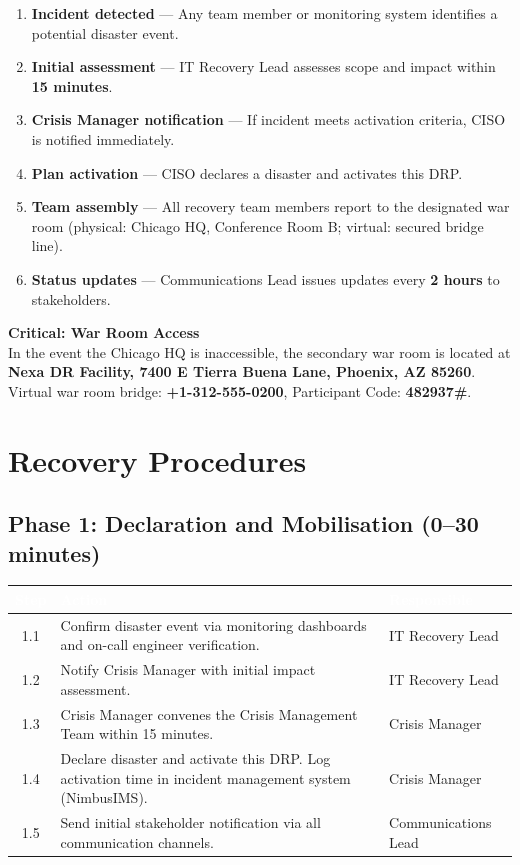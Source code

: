 \documentclass[a4paper,11pt]{article}
\begin{document}
\begin{enumerate}[nosep, leftmargin=*]
  \item \textbf{Incident detected} --- Any team member or monitoring system identifies a potential disaster event.
  \item \textbf{Initial assessment} --- IT Recovery Lead assesses scope and impact within \textbf{15 minutes}.
  \item \textbf{Crisis Manager notification} --- If incident meets activation criteria, CISO is notified immediately.
  \item \textbf{Plan activation} --- CISO declares a disaster and activates this DRP.
  \item \textbf{Team assembly} --- All recovery team members report to the designated war room (physical: Chicago HQ, Conference Room B; virtual: secured bridge line).
  \item \textbf{Status updates} --- Communications Lead issues updates every \textbf{2 hours} to stakeholders.
\end{enumerate}

\begin{alertbox}
\textbf{Critical: War Room Access}\\[4pt]
In the event the Chicago HQ is inaccessible, the secondary war room is located at \textbf{Nexa DR Facility, 7400 E Tierra Buena Lane, Phoenix, AZ 85260}. Virtual war room bridge: \textbf{+1-312-555-0200}, Participant Code: \textbf{482937\#}.
\end{alertbox}

\clearpage

\section{Recovery Procedures}

\subsection{Phase 1: Declaration and Mobilisation (0--30 minutes)}

\begin{tabularx}{\textwidth}{@{}c X l@{}}
  \toprule
  \rowcolor{tablehead}
  \textcolor{white}{\textbf{Step}} & \textcolor{white}{\textbf{Action}} & \textcolor{white}{\textbf{Responsible}}\\
  \midrule
  1.1 & Confirm disaster event via monitoring dashboards and on-call engineer verification. & IT Recovery Lead\\
  \rowcolor{tablerow}
  1.2 & Notify Crisis Manager with initial impact assessment. & IT Recovery Lead\\
  1.3 & Crisis Manager convenes the Crisis Management Team within 15 minutes. & Crisis Manager\\
  \rowcolor{tablerow}
  1.4 & Declare disaster and activate this DRP. Log activation time in incident management system (NimbusIMS). & Crisis Manager\\
  1.5 & Send initial stakeholder notification via all communication channels. & Communications Lead\\
  \bottomrule
\end{tabularx}
\end{document}
